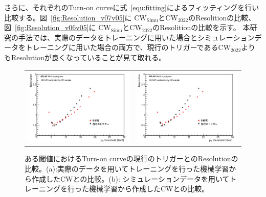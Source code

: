 
さらに、それぞれのTurn-on curveに式~\eqref{equ:fitting}によるフィッティングを行い比較する。図~\ref{fig:Resolution_v07v05}に $\mathrm{CW_{Simu}}$と$\mathrm{CW_{2022}}$のResolitionの比較、図~\ref{fig:Resolution_v06v05}に $\mathrm{CW_{Simu}}$と$\mathrm{CW_{2022}}$のResolitionの比較を示す。
本研究の手法では、実際のデータをトレーニングに用いた場合とシミュレーションデータをトレーニングに用いた場合の両方で、現行のトリガーである$\mathrm{CW_{2022}}$よりもResolutionが良くなっていることが見て取れる。

\begin{figure}
    \begin{tabular}{cc}
    \begin{minipage}[b]{0.45\hsize}
        \includegraphics[clip, width=7cm]{fig/4/resolution_v07_v05.png}
        \subcaption{}
        \label{fig:Resolution_v07v05}
    \end{minipage}&
    \begin{minipage}[b]{0.45\hsize}
        \includegraphics[clip, width=7cm]{fig/4/resolution_v07_v05.png}
        \subcaption{}
        \label{fig:Resolution_v06v05}
    \end{minipage}
    \end{tabular}
    \caption{ある閾値におけるTurn-on curveの現行のトリガーとのResolutionの比較。(a):実際のデータを用いてトレーニングを行った機械学習から作成したCWとの比較。(b): シミュレーションデータを用いてトレーニングを行った機械学習から作成したCWとの比較。}
    \label{}
\end{figure}

